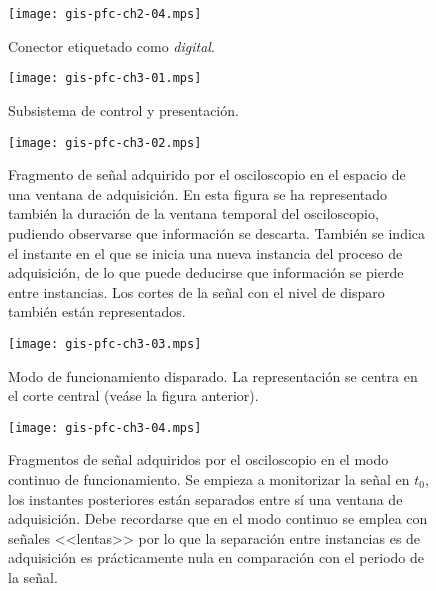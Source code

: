 \documentclass[a4paper,12pt]				{article}
\begin{document}
\begin{figure}
	\begin{center}
		\texttt{[image: gis-pfc-ch2-04.mps]}
	\end{center}
	\caption[Conector etiquetado como \emph{digital}]{Conector
	etiquetado como \emph{digital}.}
	\label{fig:digital}
\end{figure}

\clearpage

\begin{figure}
	\begin{center}
		\texttt{[image: gis-pfc-ch3-01.mps]}
	\end{center}
	\caption[Subsistema de control y presentación]{Subsistema de
	control y presentación.}
	\label{sub:control}
\end{figure}

\begin{figure}
	\begin{center}
		\texttt{[image: gis-pfc-ch3-02.mps]}
	\end{center}
	\caption[Fragmento de señal adquirido por el osciloscopio en el
	espacio de una ventana de adquisición]{Fragmento de señal adquirido
	por el osciloscopio en el espacio de una ventana de adquisición. En
	esta figura se ha representado también la duración de la ventana
	temporal del osciloscopio, pudiendo observarse que información se
	descarta. También se indica el instante en el que se inicia una
	nueva instancia del proceso de adquisición, de lo que puede
	deducirse que información se pierde entre instancias. Los cortes de
	la señal con el nivel de disparo también están representados.}
	\label{fig:freesignal}
\end{figure}

\begin{figure}
	\begin{center}
		\texttt{[image: gis-pfc-ch3-03.mps]}
	\end{center}
	\caption[Modo de funcionamiento disparado]{Modo de funcionamiento
	disparado. La representación se centra en el corte central (veáse
	la figura anterior).}
	\label{fig:digtrigosc}
\end{figure}

\begin{figure}
	\begin{center}
		\texttt{[image: gis-pfc-ch3-04.mps]}
	\end{center}
	\caption[Fragmentos de señal ordenados según llegan al
	osciloscopio]{Fragmentos de señal adquiridos por el osciloscopio en
	el modo continuo de funcionamiento. Se empieza a monitorizar la
	señal en $t_0$, los instantes posteriores están separados entre sí
	una ventana de adquisición. Debe recordarse que en el modo continuo
	se emplea con señales <<lentas>> por lo que la separación entre
	instancias es de adquisición es prácticamente nula en comparación
	con el periodo de la señal.}
	\label{fig:freesignalcont}
\end{figure}
\end{document}

